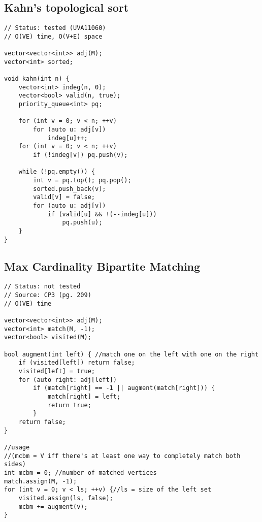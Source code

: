 \documentclass[12pt, a4paper, twoside]{article}
\begin{document}
\subsection{Kahn's topological sort}
\begin{lstlisting}
// Status: tested (UVA11060)
// O(VE) time, O(V+E) space

vector<vector<int>> adj(M);
vector<int> sorted;

void kahn(int n) {
	vector<int> indeg(n, 0);
	vector<bool> valid(n, true);
	priority_queue<int> pq;

	for (int v = 0; v < n; ++v)
		for (auto u: adj[v])
			indeg[u]++;
	for (int v = 0; v < n; ++v)
		if (!indeg[v]) pq.push(v);

	while (!pq.empty()) {
		int v = pq.top(); pq.pop();
		sorted.push_back(v);
		valid[v] = false;
		for (auto u: adj[v])
			if (valid[u] && !(--indeg[u]))
				pq.push(u);
	}
}
\end{lstlisting}

\subsection{Max Cardinality Bipartite Matching}
\begin{lstlisting}
// Status: not tested
// Source: CP3 (pg. 209)
// O(VE) time

vector<vector<int>> adj(M);
vector<int> match(M, -1);
vector<bool> visited(M);

bool augment(int left) { //match one on the left with one on the right
	if (visited[left]) return false;
	visited[left] = true;
	for (auto right: adj[left])
		if (match[right] == -1 || augment(match[right])) {
			match[right] = left;
			return true;
		}
	return false;
}

//usage
//(mcbm = V iff there's at least one way to completely match both sides)
int mcbm = 0; //number of matched vertices
match.assign(M, -1);
for (int v = 0; v < ls; ++v) {//ls = size of the left set
	visited.assign(ls, false);
	mcbm += augment(v);
}
\end{lstlisting}
\end{document}
